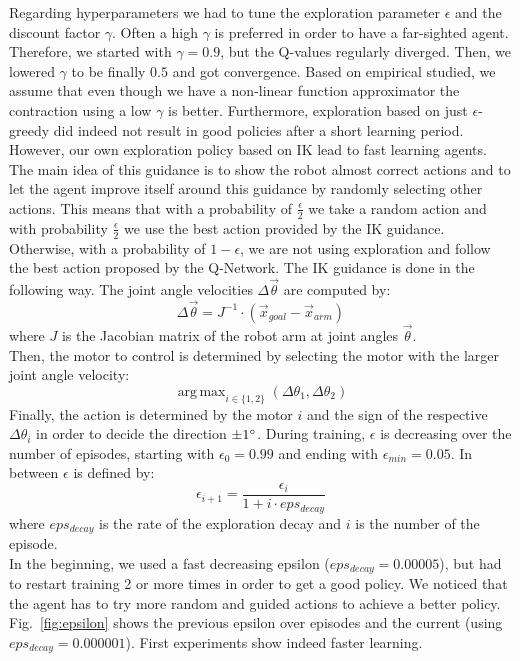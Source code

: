 \documentclass{article}
\DeclareMathOperator*{\argmax}{arg\,max}
\begin{document}
Regarding hyperparameters we had to tune the exploration parameter $\epsilon$ and the discount factor $\gamma$. Often a high $\gamma$ is preferred in order to have a far-sighted agent. Therefore, we started with $\gamma=0.9$, but the Q-values regularly diverged. Then, we lowered $\gamma$ to be finally $0.5$ and got convergence. Based on empirical studied, we assume that even though we have a non-linear function approximator the contraction using a low $\gamma$ is better. Furthermore, exploration based on just $\epsilon$-greedy did indeed not result in good policies after a short learning period. However, our own exploration policy based on IK lead to fast learning agents. The main idea of this guidance is to show the robot almost correct actions and to let the agent improve itself around this guidance by randomly selecting other actions. This means that with a probability of $\frac{\epsilon}{2}$ we take a random action and with probability $\frac{\epsilon}{2}$ we use the best action provided by the IK guidance. Otherwise, with a probability of $1-\epsilon$, we are not using exploration and follow the best action proposed by the Q-Network. The IK guidance is done in the following way. The joint angle velocities $\Delta \vec{\theta}$ are computed by:
\begin{equation}
\Delta \vec{\theta} = J^{-1} \cdot (\vec{x}_{goal} - \vec{x}_{arm})
\end{equation}
where $J$ is the Jacobian matrix of the robot arm at joint angles $\vec{\theta}$.\\
Then, the motor to control is determined by selecting the motor with the larger joint angle velocity:
\begin{equation}
\argmax_{i \in \{1,2\}}(\Delta \theta_1, \Delta \theta_2)
\end{equation}
Finally, the action is determined by the motor $i$ and the sign of the respective $\Delta \theta_i$ in order to decide the direction $\pm1\degree$. During training, $\epsilon$ is decreasing over the number of episodes, starting with $\epsilon_0 = 0.99$ and ending with $\epsilon_{min} = 0.05$. In between $\epsilon$ is defined by:
\begin{equation}
\epsilon_{i+1} = \frac{\epsilon_{i}}{1 + i \cdot eps_{decay}} 
\end{equation}
where $eps_{decay}$ is the rate of the exploration decay and $i$ is the number of the episode.
\\
In the beginning, we used a fast decreasing epsilon ($eps_{decay}=0.00005$), but had to restart training 2 or more times in order to get a good policy. We noticed that the agent has to try more random and guided actions to achieve a better policy. Fig.~\ref{fig:epsilon} shows the previous epsilon over episodes and the current (using $eps_{decay}=0.000001$). First experiments show indeed faster learning.
\end{document}
